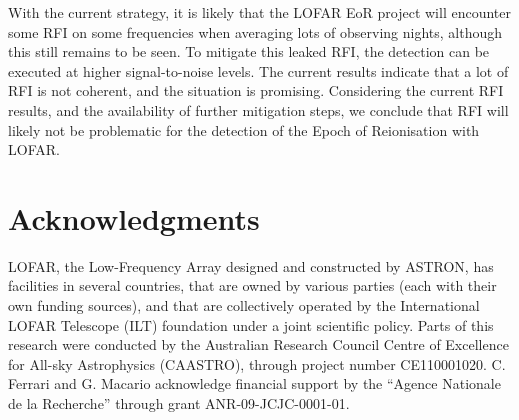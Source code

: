 \documentclass[useAMS,usenatbib]{mn2e}
\begin{document}
With the current strategy, it is likely that the LOFAR EoR project will encounter some RFI on some frequencies when averaging lots of observing nights, although this still remains to be seen. To mitigate this leaked RFI, the detection can be executed at higher signal-to-noise levels. The current results indicate that a lot of RFI is not coherent, and the situation is promising. Considering the current RFI results, and the availability of further mitigation steps, we conclude that RFI will likely not be problematic for the detection of the Epoch of Reionisation with LOFAR.

\section*{Acknowledgments}
LOFAR, the Low-Frequency Array designed and constructed by ASTRON, has facilities in several countries, that are owned by various parties (each with their own funding sources), and that are collectively operated by the International LOFAR Telescope (ILT) foundation under a joint scientific policy. Parts of this research were conducted by the Australian Research Council Centre of Excellence for All-sky Astrophysics (CAASTRO), through project number CE110001020. C. Ferrari and G. Macario acknowledge financial support by the ``Agence Nationale de la Recherche'' through grant ANR-09-JCJC-0001-01.




\label{lastpage}
\end{document}
